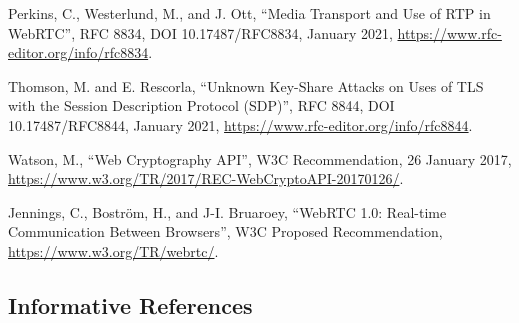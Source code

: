 \documentclass{article}
\begin{document}
\begin{description}[style=nextline, leftmargin=2cm, labelwidth=1.8cm]
\item[{[RFC8834]}] Perkins, C., Westerlund, M., and J. Ott, ``Media Transport
  and Use of RTP in WebRTC'', RFC 8834, DOI 10.17487/RFC8834,
  January 2021, \url{https://www.rfc-editor.org/info/rfc8834}.

\item[{[RFC8844]}] Thomson, M. and E. Rescorla, ``Unknown Key-Share Attacks on
  Uses of TLS with the Session Description Protocol (SDP)'',
  RFC 8844, DOI 10.17487/RFC8844, January 2021,
  \url{https://www.rfc-editor.org/info/rfc8844}.

\item[{[webcrypto]}] Watson, M., ``Web Cryptography API'', W3C Recommendation, 26
  January 2017,
  \url{https://www.w3.org/TR/2017/REC-WebCryptoAPI-20170126/}.

\item[{[webrtc-api]}] Jennings, C., Bostr\"{o}m, H., and J-I. Bruaroey, ``WebRTC 1.0:
  Real-time Communication Between Browsers'', W3C Proposed
  Recommendation, \url{https://www.w3.org/TR/webrtc/}.

\end{description}

\subsection{Informative References}
\end{document}

